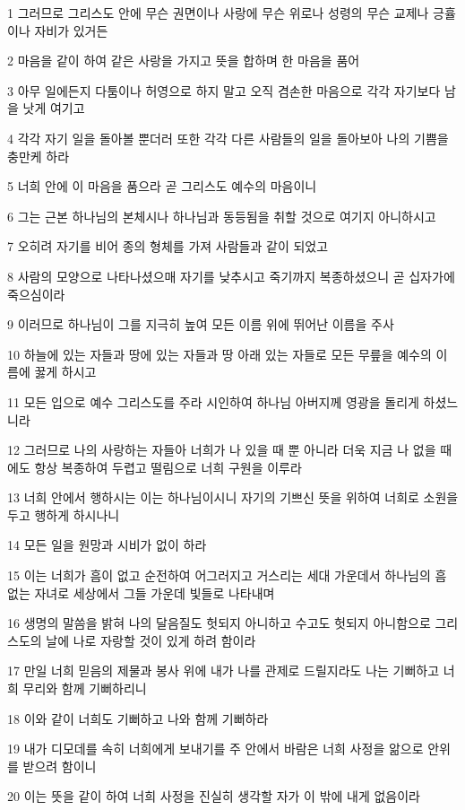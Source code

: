 \par 1 그러므로 그리스도 안에 무슨 권면이나 사랑에 무슨 위로나 성령의 무슨 교제나 긍휼이나 자비가 있거든
\par 2 마음을 같이 하여 같은 사랑을 가지고 뜻을 합하며 한 마음을 품어
\par 3 아무 일에든지 다툼이나 허영으로 하지 말고 오직 겸손한 마음으로 각각 자기보다 남을 낫게 여기고
\par 4 각각 자기 일을 돌아볼 뿐더러 또한 각각 다른 사람들의 일을 돌아보아 나의 기쁨을 충만케 하라
\par 5 너희 안에 이 마음을 품으라 곧 그리스도 예수의 마음이니
\par 6 그는 근본 하나님의 본체시나 하나님과 동등됨을 취할 것으로 여기지 아니하시고
\par 7 오히려 자기를 비어 종의 형체를 가져 사람들과 같이 되었고
\par 8 사람의 모양으로 나타나셨으매 자기를 낮추시고 죽기까지 복종하셨으니 곧 십자가에 죽으심이라
\par 9 이러므로 하나님이 그를 지극히 높여 모든 이름 위에 뛰어난 이름을 주사
\par 10 하늘에 있는 자들과 땅에 있는 자들과 땅 아래 있는 자들로 모든 무릎을 예수의 이름에 꿇게 하시고
\par 11 모든 입으로 예수 그리스도를 주라 시인하여 하나님 아버지께 영광을 돌리게 하셨느니라
\par 12 그러므로 나의 사랑하는 자들아 너희가 나 있을 때 뿐 아니라 더욱 지금 나 없을 때에도 항상 복종하여 두렵고 떨림으로 너희 구원을 이루라
\par 13 너희 안에서 행하시는 이는 하나님이시니 자기의 기쁘신 뜻을 위하여 너희로 소원을 두고 행하게 하시나니
\par 14 모든 일을 원망과 시비가 없이 하라
\par 15 이는 너희가 흠이 없고 순전하여 어그러지고 거스리는 세대 가운데서 하나님의 흠 없는 자녀로 세상에서 그들 가운데 빛들로 나타내며
\par 16 생명의 말씀을 밝혀 나의 달음질도 헛되지 아니하고 수고도 헛되지 아니함으로 그리스도의 날에 나로 자랑할 것이 있게 하려 함이라
\par 17 만일 너희 믿음의 제물과 봉사 위에 내가 나를 관제로 드릴지라도 나는 기뻐하고 너희 무리와 함께 기뻐하리니
\par 18 이와 같이 너희도 기뻐하고 나와 함께 기뻐하라
\par 19 내가 디모데를 속히 너희에게 보내기를 주 안에서 바람은 너희 사정을 앎으로 안위를 받으려 함이니
\par 20 이는 뜻을 같이 하여 너희 사정을 진실히 생각할 자가 이 밖에 내게 없음이라
